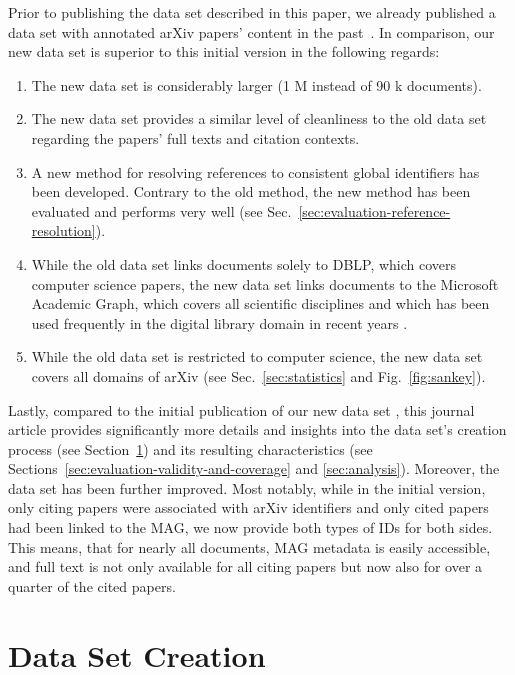 Prior to publishing the data set described in this paper, we already published a data set with annotated arXiv papers' content in the past~\cite{Faerber2018LREC}. In comparison, our new data set is superior to this initial version in the following regards:
\begin{enumerate}
    \item The new data set is considerably larger (1 M instead of 90 k documents).
    \item The new data set provides a similar level of cleanliness to the old data set regarding the papers' full texts and citation contexts.
    \item A new method for resolving references to consistent global identifiers has been developed. Contrary to the old method, the new method has been evaluated and performs very well (see Sec.~\ref{sec:evaluation-reference-resolution}).
    \item While the old data set links documents solely to DBLP, which covers computer science papers, the new data set links documents to the Microsoft Academic Graph, which covers all scientific disciplines and which has been used frequently in the digital library domain in recent years \cite{Mohapatra2019}.
    \item While the old data set is restricted to computer science, the new data set covers all domains of arXiv (see Sec.~\ref{sec:statistics} and Fig.~\ref{fig:sankey}).
\end{enumerate}

Lastly, compared to the initial publication of our new data set \cite{Saier2019BIR}, this journal article provides significantly more details and insights into the data set's creation process (see Section~\ref{sec:data-set-creation}) and its resulting characteristics (see Sections~\ref{sec:evaluation-validity-and-coverage} and \ref{sec:analysis}). Moreover, the data set has been further improved. Most notably, while in the initial version, only citing papers were associated with arXiv identifiers and only cited papers had been linked to the MAG, we now provide both types of IDs for both sides. This means, that for nearly all documents, MAG metadata is easily accessible, and full text is not only available for all citing papers but now also for over a quarter of the cited papers.

\section{Data Set Creation}
\label{sec:data-set-creation}

